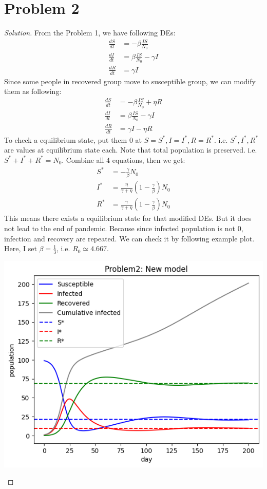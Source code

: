 \section*{Problem 2}
	\begin{proof} [Solution]
		From the Problem 1, we have following DEs:
		\begin{align*}
			\frac{dS}{dt} &= -\beta\frac{IS}{N_0}\\
			\frac{dI}{dt} &= \beta\frac{IS}{N_0} - \gamma I\\
			\frac{dR}{dt} &= \gamma I
		\end{align*}
		Since some people in recovered group move to susceptible group, we can modify them as following:
		 \begin{align*}
		 	\frac{dS}{dt} &= -\beta\frac{IS}{N_0} + \eta R\\
		 	\frac{dI}{dt} &= \beta\frac{IS}{N_0} - \gamma I\\
		 	\frac{dR}{dt} &= \gamma I - \eta R
		 \end{align*}
	 	To check a equilibrium state, put them 0 at $S = S^*, I = I^*, R = R^*$. i.e. $S^*, I^*, R^*$ are values at equilibrium state each. Note that total population is preserved. i.e. $S^* + I^* + R^* = N_0$. Combine all 4 equations, then we get:
	 	\begin{align*}
	 		S^* &= -\frac{\gamma}{\beta}N_0\\
	 		I^* &= \frac{\eta}{\gamma + \eta}\left(1 - \frac{\gamma}{\beta}\right)N_0\\
	 		R^* &= \frac{\gamma}{\gamma + \eta}\left(1 - \frac{\gamma}{\beta}\right)N_0
	 	\end{align*}
 		This means there exists a equilibrium state for that modified DEs. But it does not lead to the end of pandemic. Because since infected population is not 0, infection and recovery are repeated. We can check it by following example plot. Here, I set $\beta = \frac{1}{3}$, i.e. $R_0 \simeq 4.667$.
 		\begin{center}
			\includegraphics[scale=0.7]{Problem2_model.png}

\end{center}
\end{proof}
